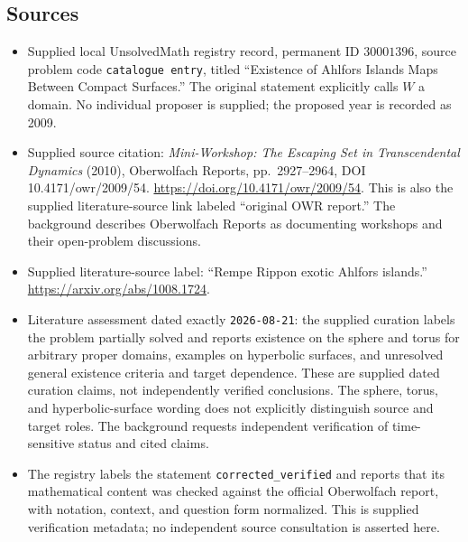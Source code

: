 \documentclass[11pt]{article}
\begin{document}
\subsection{Sources}
\begin{itemize}
\item Supplied local UnsolvedMath registry record, permanent ID \(30001396\), source problem code \texttt{catalogue entry}, titled ``Existence of Ahlfors Islands Maps Between Compact Surfaces.'' The original statement explicitly calls \(W\) a domain. No individual proposer is supplied; the proposed year is recorded as 2009.
\item Supplied source citation: \emph{Mini-Workshop: The Escaping Set in Transcendental Dynamics} (2010), Oberwolfach Reports, pp.~2927--2964, DOI 10.4171/owr/2009/54. \url{https://doi.org/10.4171/owr/2009/54}. This is also the supplied literature-source link labeled ``original OWR report.'' The background describes Oberwolfach Reports as documenting workshops and their open-problem discussions.
\item Supplied literature-source label: ``Rempe Rippon exotic Ahlfors islands.'' \url{https://arxiv.org/abs/1008.1724}.
\item Literature assessment dated exactly \texttt{2026-08-21}: the supplied curation labels the problem partially solved and reports existence on the sphere and torus for arbitrary proper domains, examples on hyperbolic surfaces, and unresolved general existence criteria and target dependence. These are supplied dated curation claims, not independently verified conclusions. The sphere, torus, and hyperbolic-surface wording does not explicitly distinguish source and target roles. The background requests independent verification of time-sensitive status and cited claims.
\item The registry labels the statement \texttt{corrected\_verified} and reports that its mathematical content was checked against the official Oberwolfach report, with notation, context, and question form normalized. This is supplied verification metadata; no independent source consultation is asserted here.
\end{itemize}
\end{document}
